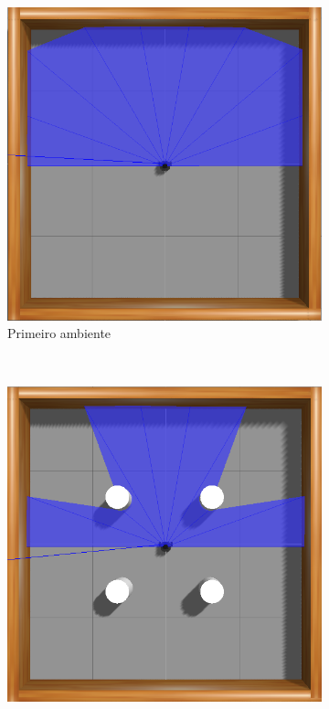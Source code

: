 \vspace{0.25cm}
\begin{figure}[H]
\caption{Ambientes de treinamento usados na simulação do Gazebo}
    \begin{center}
    \begin{subfigure}[b]{0.3\textwidth}
        \includegraphics[width=\textwidth]{imagens/simulated_envs/amb1.png}
        \caption{Primeiro ambiente}
        \label{subfig:simulated_env1}
    \end{subfigure}
    ~ %
    \begin{subfigure}[b]{0.3\textwidth}
        \includegraphics[width=\textwidth]{imagens/simulated_envs/amb2.png}

\end{subfigure}
\end{center}
\end{figure}
